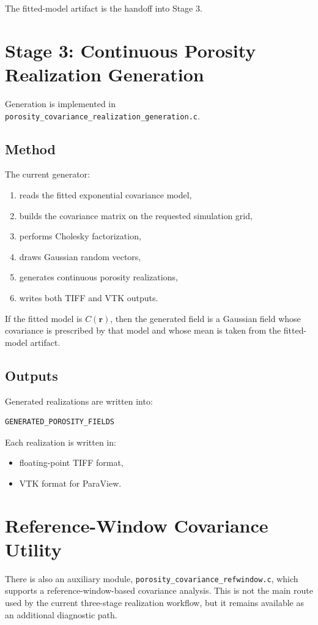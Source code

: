 \documentclass[11pt]{article}
\begin{document}
The fitted-model artifact is the handoff into Stage 3.

\section{Stage 3: Continuous Porosity Realization Generation}
Generation is implemented in
\texttt{porosity\_covariance\_realization\_generation.c}.

\subsection{Method}
The current generator:
\begin{enumerate}[label=\arabic*.]
\item reads the fitted exponential covariance model,
\item builds the covariance matrix on the requested simulation grid,
\item performs Cholesky factorization,
\item draws Gaussian random vectors,
\item generates continuous porosity realizations,
\item writes both TIFF and VTK outputs.
\end{enumerate}

If the fitted model is \(C(\bm{r})\), then the generated field is a Gaussian
field whose covariance is prescribed by that model and whose mean is taken from
the fitted-model artifact.

\subsection{Outputs}
Generated realizations are written into:
\begin{verbatim}
GENERATED_POROSITY_FIELDS
\end{verbatim}

Each realization is written in:
\begin{itemize}
\item floating-point TIFF format,
\item VTK format for ParaView.
\end{itemize}

\section{Reference-Window Covariance Utility}
There is also an auxiliary module,
\texttt{porosity\_covariance\_refwindow.c}, which supports a
reference-window-based covariance analysis. This is not the main route used by
the current three-stage realization workflow, but it remains available as an
additional diagnostic path.
\end{document}
